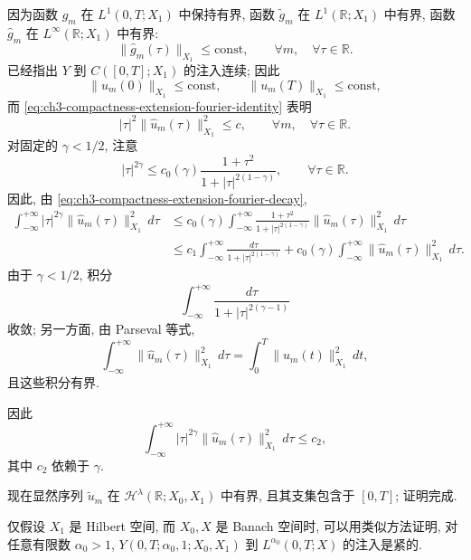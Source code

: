 \begin{Proof}
因为函数 $g_m$ 在 $L^1(0,T;X_1)$ 中保持有界, 函数 $\widetilde g_m$ 在 $L^1(\mathbb R;X_1)$ 中有界, 函数 $\widehat g_m$ 在 $L^\infty(\mathbb R;X_1)$ 中有界:
\begin{equation}
\lVert\widehat g_m(\tau)\rVert_{X_1}\leq\mathrm{const},
\qquad\forall m,\quad\forall\tau\in\mathbb R.
\label{eq:ch3-compactness-extension-g-fourier-bound}
\end{equation}
已经指出 $Y$ 到 $C([0,T];X_1)$ 的注入连续; 因此
\[
\lVert u_m(0)\rVert_{X_1}\leq\mathrm{const},
\qquad
\lVert u_m(T)\rVert_{X_1}\leq\mathrm{const},
\]
而 \eqref{eq:ch3-compactness-extension-fourier-identity} 表明
\begin{equation}
|\tau|^2\lVert\widehat u_m(\tau)\rVert_{X_1}^2\leq c,
\qquad\forall m,\quad\forall\tau\in\mathbb R.
\label{eq:ch3-compactness-extension-fourier-decay}
\end{equation}
对固定的 $\gamma<1/2$, 注意
\[
|\tau|^{2\gamma}\leq c_0(\gamma)
\frac{1+\tau^2}{1+|\tau|^{2(1-\gamma)}},
\qquad\forall\tau\in\mathbb R.
\]
因此, 由 \eqref{eq:ch3-compactness-extension-fourier-decay},
\[
\begin{aligned}
\int_{-\infty}^{+\infty}|\tau|^{2\gamma}
\lVert\widehat u_m(\tau)\rVert_{X_1}^2\,d\tau
&\leq c_0(\gamma)\int_{-\infty}^{+\infty}
\frac{1+\tau^2}{1+|\tau|^{2(1-\gamma)}}
\lVert\widehat u_m(\tau)\rVert_{X_1}^2\,d\tau\\
&\leq c_1\int_{-\infty}^{+\infty}
\frac{d\tau}{1+|\tau|^{2(1-\gamma)}}
+c_0(\gamma)\int_{-\infty}^{+\infty}
\lVert\widehat u_m(\tau)\rVert_{X_1}^2\,d\tau.
\end{aligned}
\]
由于 $\gamma<1/2$, 积分
\[
\int_{-\infty}^{+\infty}\frac{d\tau}{1+|\tau|^{2(\gamma-1)}}
\]
收敛; 另一方面, 由 Parseval 等式,
\[
\int_{-\infty}^{+\infty}\lVert\widehat u_m(\tau)\rVert_{X_1}^2\,d\tau
=\int_0^T\lVert u_m(t)\rVert_{X_1}^2\,dt,
\]
且这些积分有界.

因此
\begin{equation}
\int_{-\infty}^{+\infty}|\tau|^{2\gamma}
\lVert\widehat u_m(\tau)\rVert_{X_1}^2\,d\tau\leq c_2,
\label{eq:ch3-compactness-extension-fractional-bound}
\end{equation}
其中 $c_2$ 依赖于 $\gamma$.

现在显然序列 $\widetilde u_m$ 在 $\mathcal H^\lambda(\mathbb R;X_0,X_1)$ 中有界, 且其支集包含于 $[0,T]$; 证明完成.
\end{Proof}

\hypertarget{chapter-03-page-204}{}
\begin{Remark}
\label{rem:ch3-compactness-banach-x0-x-banach}
仅假设 $X_1$ 是 Hilbert 空间, 而 $X_0,X$ 是 Banach 空间时, 可以用类似方法证明, 对任意有限数 $\alpha_0>1$, $Y(0,T;\alpha_0,1;X_0,X_1)$ 到 $L^{\alpha_0}(0,T;X)$ 的注入是紧的.
\end{Remark}
